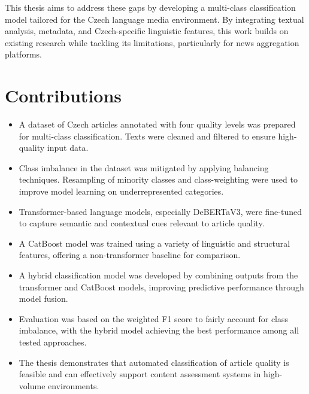 This thesis aims to address these gaps by developing a multi-class classification model tailored for the Czech language media environment. By integrating textual analysis, metadata, and Czech-specific linguistic features, this work builds on existing research while tackling its limitations, particularly for news aggregation platforms.

\section{Contributions}

\begin{itemize}
  \item A dataset of Czech articles annotated with four quality levels was prepared for multi-class classification. Texts were cleaned and filtered to ensure high-quality input data.
  \item Class imbalance in the dataset was mitigated by applying balancing techniques. Resampling of minority classes and class-weighting were used to improve model learning on underrepresented categories.
  \item Transformer-based language models, especially \ac{DeBERTaV3}, were fine-tuned to capture semantic and contextual cues relevant to article quality.
  \item A \ac{CatBoost} model was trained using a variety of linguistic and structural features, offering a non-transformer baseline for comparison.
  \item A hybrid classification model was developed by combining outputs from the transformer and \ac{CatBoost} models, improving predictive performance through model fusion.
  \item Evaluation was based on the weighted F1 score to fairly account for class imbalance, with the hybrid model achieving the best performance among all tested approaches.
  \item The thesis demonstrates that automated classification of article quality is feasible and can effectively support content assessment systems in high-volume environments.
\end{itemize}